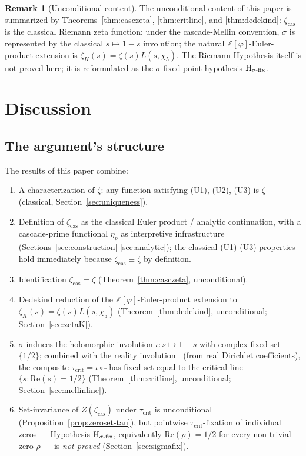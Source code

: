 \documentclass[11pt, a4paper]{amsart}
\theoremstyle{definition}
\newtheorem{remark}[theorem]{Remark}
\newcommand{\Z}{\mathbb{Z}}
\newcommand{\pphi}{\varphi}
\newcommand{\zetacas}{\zeta_{\mathrm{cas}}}
\begin{document}
\begin{remark}[Unconditional content]
The unconditional content of this paper is summarized by
Theorems~\ref{thm:casczeta}, \ref{thm:critline}, and
\ref{thm:dedekind}: $\zetacas$ is the classical Riemann zeta
function; under the cascade-Mellin convention,
$\sigma$ is represented by the classical $s \mapsto 1-s$
involution; the natural $\Z[\pphi]$-Euler-product extension is
$\zeta_K(s) = \zeta(s) L(s,\chi_5)$. The Riemann Hypothesis
itself is not proved here; it is reformulated as the
$\sigma$-fixed-point hypothesis $\textup{H}_{\sigma\text{-fix}}$.
\end{remark}

\section{Discussion}\label{sec:discussion}

\subsection{The argument's structure}

The results of this paper combine:
\begin{enumerate}
\item A characterization of $\zeta$: any function satisfying (U1),
(U2), (U3) is $\zeta$ (classical, Section~\ref{sec:uniqueness}).
\item Definition of $\zetacas$ as the classical Euler product /
analytic continuation, with a cascade-prime functional $\eta_p$ as
interpretive infrastructure
(Sections~\ref{sec:construction}-\ref{sec:analytic}); the
classical (U1)-(U3) properties hold immediately because
$\zetacas \equiv \zeta$ by definition.
\item Identification $\zetacas = \zeta$ (Theorem~\ref{thm:casczeta},
unconditional).
\item Dedekind reduction of the $\Z[\pphi]$-Euler-product extension
to $\zeta_K(s) = \zeta(s) L(s,\chi_5)$
(Theorem~\ref{thm:dedekind}, unconditional;
Section~\ref{sec:zetaK}).
\item $\sigma$ induces the holomorphic involution $\iota: s \mapsto
1-s$ with complex fixed set $\{1/2\}$; combined with the reality
involution $\bar{\ }$ (from real Dirichlet coefficients), the
composite $\tau_{\mathrm{crit}} = \iota \circ \bar{\ }$ has fixed set
equal to the critical line $\{s : \mathrm{Re}(s) = 1/2\}$
(Theorem~\ref{thm:critline}, unconditional;
Section~\ref{sec:mellinline}).
\item Set-invariance of $Z(\zetacas)$ under $\tau_{\mathrm{crit}}$
is unconditional (Proposition~\ref{prop:zeroset-tau}), but pointwise
$\tau_{\mathrm{crit}}$-fixation of individual zeros — Hypothesis
$\textup{H}_{\sigma\text{-fix}}$, equivalently
$\mathrm{Re}(\rho) = 1/2$ for every non-trivial zero $\rho$ — is
\emph{not proved} (Section~\ref{sec:sigmafix}).
\end{enumerate}
\end{document}
